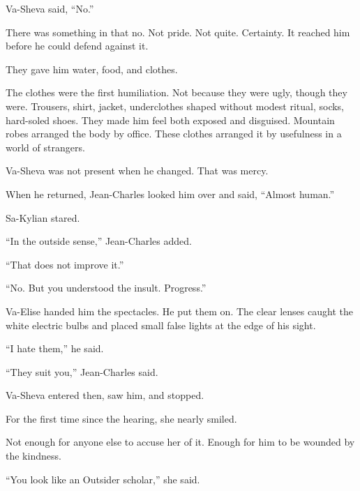 Va-Sheva said, “No.”\par

There was something in that no. Not pride. Not quite. Certainty. It reached him before he could defend against it.\par

They gave him water, food, and clothes.\par

The clothes were the first humiliation. Not because they were ugly, though they were. Trousers, shirt, jacket, underclothes shaped without modest ritual, socks, hard-soled shoes. They made him feel both exposed and disguised. Mountain robes arranged the body by office. These clothes arranged it by usefulness in a world of strangers.\par

Va-Sheva was not present when he changed. That was mercy.\par

When he returned, Jean-Charles looked him over and said, “Almost human.”\par

Sa-Kylian stared.\par

“In the outside sense,” Jean-Charles added.\par

“That does not improve it.”\par

“No. But you understood the insult. Progress.”\par

Va-Elise handed him the spectacles. He put them on. The clear lenses caught the white electric bulbs and placed small false lights at the edge of his sight.\par

“I hate them,” he said.\par

“They suit you,” Jean-Charles said.\par

Va-Sheva entered then, saw him, and stopped.\par

For the first time since the hearing, she nearly smiled.\par

Not enough for anyone else to accuse her of it. Enough for him to be wounded by the kindness.\par

“You look like an Outsider scholar,” she said.\par

